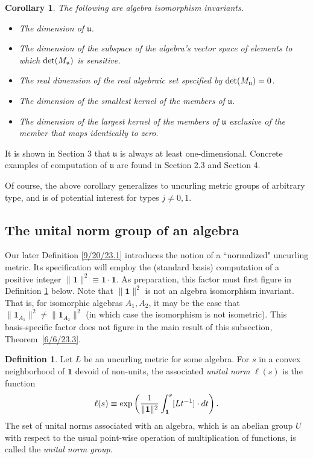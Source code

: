 \documentclass{amsart}
\numberwithin{equation}{section}
\newtheorem{corollary}[theorem]{Corollary}
\theoremstyle{definition}
\newtheorem{definition}[theorem]{Definition}
\numberwithin{theorem}{section}
\begin{document}
  \begin{corollary}\label{8/18/23.2} The following are algebra isomorphism invariants. \begin{itemize} \item The dimension of $\mathfrak{u}$. \item The dimension of the subspace of the algebra's vector space of elements to which ${\rm det}(M_{\mathfrak{u}})$ is sensitive. \item The real dimension of the real algebraic set specified by ${\rm det}(M_{\mathfrak{u}}) = 0$.  \item The dimension of the smallest kernel of the members of $\mathfrak{u}$.  \item The dimension of the largest kernel of the members of $\mathfrak{u}$ exclusive of the member that maps identically to zero.\end{itemize} \end{corollary}

 It is shown in Section 3 that $\mathfrak{u}$ is always at least one-dimensional.   Concrete examples of computation of $\mathfrak{u}$ are found in Section 2.3 and Section 4.  
 
 Of course, the above corollary generalizes to uncurling metric groups of arbitrary type, and is of potential interest for types $j\ne 0,1$.

\subsection{The unital norm group of an algebra}
  
Our later Definition \ref{9/20/23.1} introduces the notion of a ``normalized" uncurling metric.  Its specification will employ the (standard basis) computation of a positive integer $\|\mathbf{1}\|^2 \equiv \mathbf{1} \cdot \mathbf{1}$. As preparation, this factor must first figure in Definition \ref{9/21/23.2} below.   Note that $\|\mathbf{1}\|^2$ is not an algebra isomorphism invariant.  That is, for isomorphic algebras $A_1,A_2$, it may be the case that $\|\mathbf{1}_{A_1}\|^2 \ne \|\mathbf{1}_{A_2}\|^2$ (in which case the isomorphism is not isometric).  This basis-specific factor does not figure in the main result of this subsection, \mbox{Theorem \ref{6/6/23.3}.}

  
  \begin{definition}\label{9/21/23.2} Let $L$ be an uncurling metric for some algebra.  For $s$ in a convex neighborhood of $\mathbf{1}$ devoid of non-units, the associated {\it unital norm} $ \ell(s)$ is the function
  \begin{equation}\label{11/7/20.2}   \ell(s) \equiv \exp\left({\frac{1}{\|{\bf 1}\|^2}\int_{\bf 1}^s [Lt^{-1}]\cdot dt}\right).\end{equation} 
   The set of unital norms associated with an algebra, which is an abelian group $U$ with respect to the usual point-wise operation of multiplication of functions, is called the {\it unital norm group}. \end{definition} 
   
\end{document}

